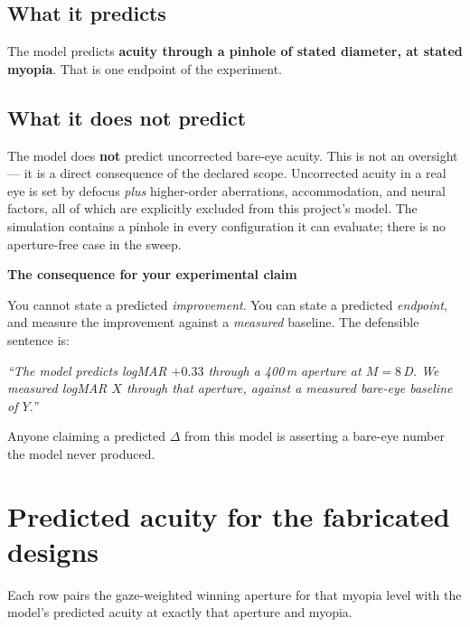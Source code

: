 \documentclass[11pt]{report}
\newenvironment{keybox}[1]%
{\par\vspace{8pt}\begin{lrbox}{\kbsave}\begin{minipage}{0.88\textwidth}%
{\bfseries\color{hbblue}#1}\par\vspace{4pt}\ignorespaces}%
{\end{minipage}\end{lrbox}%
\begin{center}\setlength{\fboxrule}{1.2pt}\setlength{\fboxsep}{8pt}%
\fcolorbox{hbblue}{boxgrey}{\usebox{\kbsave}}\end{center}\vspace{8pt}\par}
\begin{document}
\section{What it predicts}

The model predicts \textbf{acuity through a pinhole of stated diameter, at stated myopia}. That is
one endpoint of the experiment.

\section{What it does not predict}

The model does \textbf{not} predict uncorrected bare-eye acuity. This is not an oversight --- it is a
direct consequence of the declared scope. Uncorrected acuity in a real eye is set by defocus
\emph{plus} higher-order aberrations, accommodation, and neural factors, all of which are explicitly
excluded from this project's model. The simulation contains a pinhole in every configuration it can
evaluate; there is no aperture-free case in the sweep.

\begin{keybox}{The consequence for your experimental claim}
You cannot state a predicted \emph{improvement}. You can state a predicted \emph{endpoint}, and
measure the improvement against a \emph{measured} baseline. The defensible sentence is:

\emph{``The model predicts logMAR $+0.33$ through a 400\,\textmu m aperture at $M=8$\,D. We measured
logMAR $X$ through that aperture, against a measured bare-eye baseline of $Y$.''}

Anyone claiming a predicted $\Delta$ from this model is asserting a bare-eye number the model never
produced.
\end{keybox}

\chapter{Predicted acuity for the fabricated designs}

Each row pairs the gaze-weighted winning aperture for that myopia level with the model's predicted
acuity at exactly that aperture and myopia.
\end{document}
